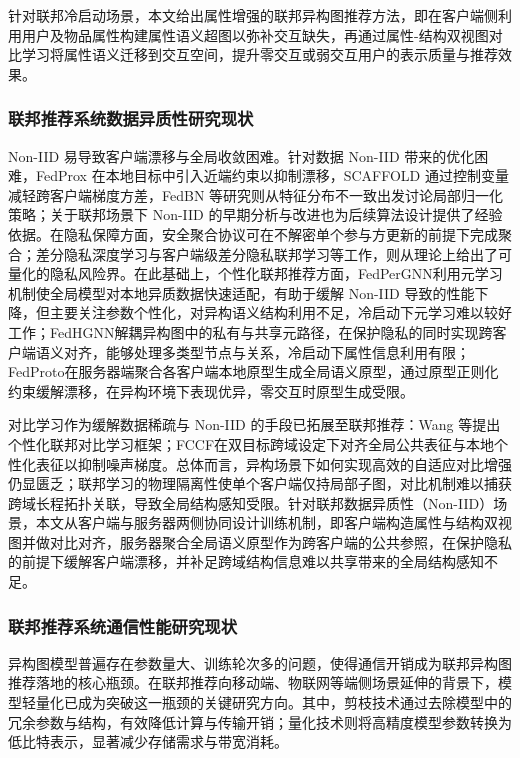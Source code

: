 针对联邦冷启动场景，本文给出属性增强的联邦异构图推荐方法，即在客户端侧利用用户及物品属性构建属性语义超图以弥补交互缺失，再通过属性-结构双视图对比学习将属性语义迁移到交互空间，提升零交互或弱交互用户的表示质量与推荐效果。

\subsubsection{联邦推荐系统数据异质性研究现状}
Non-IID 易导致客户端漂移与全局收敛困难\cite{ye2023heterogeneous, tan2023fedstar}。针对数据 Non-IID 带来的优化困难，FedProx 在本地目标中引入近端约束以抑制漂移\cite{li2020fedprox}，SCAFFOLD 通过控制变量减轻跨客户端梯度方差\cite{karimireddy2020scaffold}，FedBN 等研究则从特征分布不一致出发讨论局部归一化策略\cite{li2021fedbn}；关于联邦场景下 Non-IID 的早期分析与改进也为后续算法设计提供了经验依据\cite{zhao2018flnoniid}。在隐私保障方面，安全聚合协议可在不解密单个参与方更新的前提下完成聚合\cite{bonawitz2017secureagg}；差分隐私深度学习与客户端级差分隐私联邦学习等工作，则从理论上给出了可量化的隐私风险界\cite{abadi2016differentialpriv,geyer2019differentialfl}。在此基础上，个性化联邦推荐方面，FedPerGNN\cite{wu2022fedpergnn}利用元学习机制使全局模型对本地异质数据快速适配，有助于缓解 Non-IID 导致的性能下降，但主要关注参数个性化，对异构语义结构利用不足，冷启动下元学习难以较好工作；FedHGNN\cite{yan2024fedhgnn}解耦异构图中的私有与共享元路径，在保护隐私的同时实现跨客户端语义对齐，能够处理多类型节点与关系，冷启动下属性信息利用有限；FedProto\cite{tan2022fedproto}在服务器端聚合各客户端本地原型生成全局语义原型，通过原型正则化约束缓解漂移，在异构环境下表现优异，零交互时原型生成受限。

对比学习作为缓解数据稀疏与 Non-IID 的手段已拓展至联邦推荐：Wang 等\cite{wang2025fedpcl}提出个性化联邦对比学习框架；FCCF\cite{ji2023fccf}在双目标跨域设定下对齐全局公共表征与本地个性化表征以抑制噪声梯度。总体而言，异构场景下如何实现高效的自适应对比增强仍显匮乏；联邦学习的物理隔离性使单个客户端仅持局部子图，对比机制难以捕获跨域长程拓扑关联，导致全局结构感知受限。针对联邦数据异质性（Non-IID）场景，本文从客户端与服务器两侧协同设计训练机制，即客户端构造属性与结构双视图并做对比对齐，服务器聚合全局语义原型作为跨客户端的公共参照，在保护隐私的前提下缓解客户端漂移，并补足跨域结构信息难以共享带来的全局结构感知不足。

\subsubsection{联邦推荐系统通信性能研究现状}
异构图模型普遍存在参数量大、训练轮次多的问题，使得通信开销成为联邦异构图推荐落地的核心瓶颈\cite{jiang2022fedmp, khan2025hufe, reisizadeh2020fedpaq}。在联邦推荐向移动端、物联网等端侧场景延伸的背景下，模型轻量化已成为突破这一瓶颈的关键研究方向。其中，剪枝技术通过去除模型中的冗余参数与结构，有效降低计算与传输开销\cite{jiang2022fedmp}；量化技术则将高精度模型参数转换为低比特表示，显著减少存储需求与带宽消耗\cite{khan2025hufe}。

